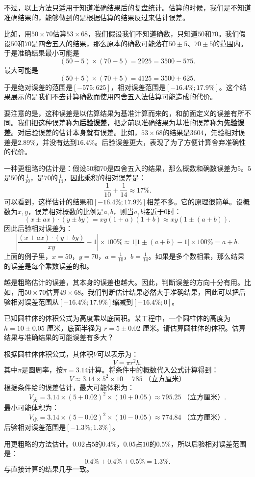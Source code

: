 \documentclass[12pt,UTF8]{ctexbook}
\begin{document}
不过，以上方法只适用于知道准确结果后的复盘统计。估算的时候，我们是不知道准确结果的，能够做到的是根据估算的结果反过来估计误差。

比如，用$50\times 70$估算$53 \times 68$，我们假设我们不知道确数，只知道$50$和$70$。我们假设$50$和$70$是四舍五入的结果，那么原本的确数可能落在$50\pm 5$、$70\pm 5$的范围内。于是准确结果最小可能是
$$ (50 - 5) \times (70 - 5) = 2925 = 3500 - 575.$$
最大可能是
$$ (50 + 5) \times (70 + 5) = 4125 = 3500 + 625.$$
于是绝对误差的范围是$[- 575; 625]$，相对误差范围是$[-16.4\%;17.9\%]$。这个结果展示的是我们不去计算确数而使用四舍五入法估算可能造成的代价。

要注意的是，这种误差是以估算结果为基准计算而来的，和前面定义的误差有所不同。我们把这种误差称为\textbf{后验误差}，把之前以准确结果为基准的误差称为\textbf{先验误差}。对后验误差的估计本身就有误差。比如，$53 \times 68$的结果是$3604$，先验相对误差是$2.89\%$，并没有达到$16.4\%$。后验误差更大，表现了为了方便计算舍弃准确性的代价。

一种更粗略的估计是：假设$50$和$70$是四舍五入的结果，那么概数和确数误差为$5$。$5$是$50$的$\frac{1}{10}$，是$70$的$\frac{1}{14}$，因此乘积的相对误差是：
$$ \frac{1}{10} + \frac{1}{14} \approx 17\%. $$
可以看到，这样估计的结果和$[-16.4\%;17.9\%]$相差不多。它的原理很简单。设概数为$x,y$，误差相对概数的比例是$a,b$，则当$a,b$接近于$0$时：
$$ (x \pm ax) \cdot (y \pm by) = xy (1 + a)(1 + b) \approx xy(1 \pm (a + b)).$$
因此后验相对误差为：
$$ \left|\frac{(x \pm ax) \cdot (y \pm by)}{xy} - 1\right| \times 100\% \approx 1  \left| 1 \pm (a + b) - 1\right| \times 100\%  = a + b. $$
上面的例子里，$x = 50$，$y = 70$，$a = \frac{1}{10}$，$b = \frac{1}{14}$。如果是多个数相乘，那么结果的误差是每个乘数误差的和。

越是粗略估计的误差，其本身的误差也越大。因此，判断误差的方向十分有用。比如，用$50\times 70$估算$49 \times 68$。我们判断估计结果必然大于准确结果，因此可以把后验相对误差范围从$[-16.4\%;17.9\%]$缩减到$[-16.4\%;0]$。

\begin{et}
    已知圆柱体的体积公式为高度乘以底面积。某工程中，一个圆柱体的高度为 $h=10\pm 0.05$ 厘米，底面半径为 $r=5\pm 0.02$ 厘米。请估算圆柱体的体积。估算结果与准确结果的可能误差有多大？
\end{et}

\begin{so}
    根据圆柱体体积公式，其体积$V$可以表示为：
    $$ V = \pi r^2 h. $$
    其中$\pi$是圆周率，按$\pi = 3.14$计算。将条件中的概数代入公式计算得到：
    $$ V\approx 3.14 \times 5^2 \times 10 = 785 \;\mbox{（立方厘米）}$$
    根据条件给的误差估计，最大可能体积为：
    $$ V_{\text{大}} = 3.14 \times (5 +0.02)^2 \times (10+0.05) \approx 795.25 \;\mbox{（立方厘米）}. $$
    最小可能体积为：
    $$ V_{\text{小}} = 3.14 \times (5 -0.02)^2 \times (10-0.05) \approx 774.84 \;\mbox{（立方厘米）}. $$
    后验相对误差范围是$[-1.3\%;1.3\%]$。

    用更粗略的方法估计。$0.02$占$5$的$0.4\%$，$0.05$占$10$的$0.5\%$，所以后验相对误差范围是：
    $$ 0.4\% + 0.4\% +0.5\% = 1.3\%. $$
    与直接计算的结果几乎一致。
\end{so}
\end{document}
